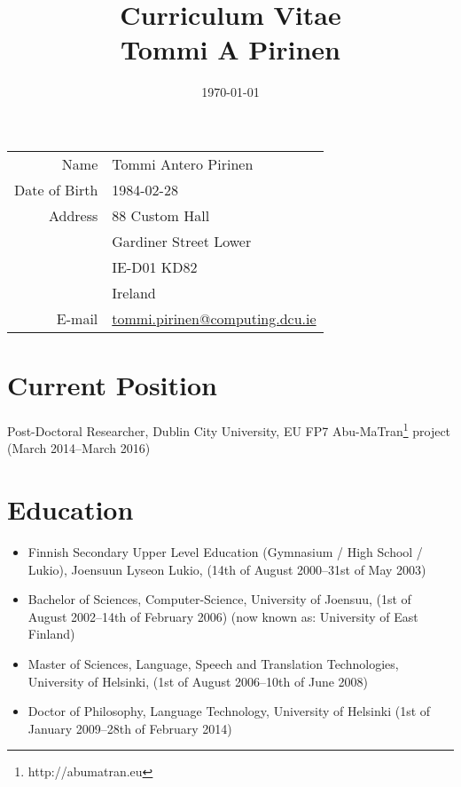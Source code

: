 \documentclass[a4paper]{article}
\title{Curriculum Vitae\\
\small{Tommi A Pirinen}}
\date{\today}
\begin{document}
\maketitle

\begin{tabular}{rl}
Name & Tommi Antero Pirinen \\
Date of Birth & 1984-02-28 \\
Address & 88 Custom Hall \\
& Gardiner Street Lower \\
& IE-D01 KD82\\
& Ireland \\
E-mail & \url{tommi.pirinen@computing.dcu.ie} \\
\end{tabular}


\section{Current Position}

Post-Doctoral Researcher, Dublin City University, EU FP7 Abu-MaTran\footnote{http://abumatran.eu} project (March 2014–March 2016)

\section{Education}

\begin{itemize}
    \item Finnish Secondary Upper Level Education (Gymnasium / High School / Lukio), Joensuun Lyseon Lukio, 
        (14th of August 2000–31st of May 2003)
    \item Bachelor of Sciences, Computer-Science, University of Joensuu,
        (1st of August 2002–14th of February 2006) (now known as: University of East Finland)
    \item Master of Sciences, Language, Speech and Translation Technologies, University of Helsinki, (1st of August 2006–10th of June 2008)
    \item Doctor of Philosophy, Language Technology, University of Helsinki (1st of January 2009–28th of February 2014)
\end{itemize}
\end{document}
